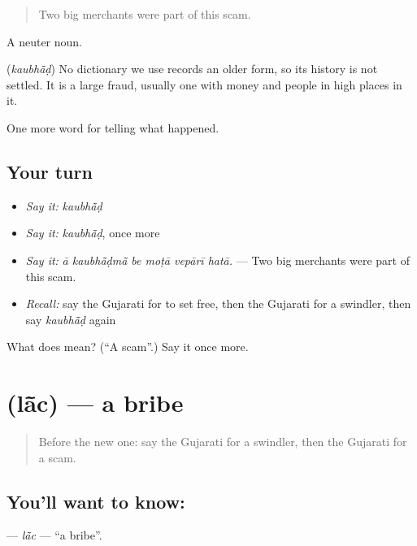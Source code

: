 \begin{quote}
Two big merchants were part of this scam.
\end{quote}

A neuter noun.

\begin{cousinweb}
\textbf{} (\emph{kaubhā̃ḍ}) No dictionary we use records an older form, so its history is not settled. It is a large fraud, usually one with money and people in high places in it.
\end{cousinweb}

\begin{grammarlens}[title={What you've built}]
One more word for telling what happened.
\end{grammarlens}

\subsection*{Your turn}
\begin{itemize}
\raggedright
  \item \emph{Say it:} \emph{kaubhā̃ḍ}
  \item \emph{Say it:} \emph{kaubhā̃ḍ}, once more
  \item \emph{Say it:} \emph{ā kaubhā̃ḍmā̃ be moṭā vepārī hatā.} — Two big merchants were part of this scam.
  \item \emph{Recall:} say the Gujarati for to set free, then the Gujarati for a swindler, then say \emph{kaubhā̃ḍ} again
\end{itemize}

\begin{tcolorbox}[breakable,colback=teal!4,colframe=teal!35!black,title={Before you move on}]
What does  mean? (\textquotedblleft{}A scam\textquotedblright{}.) Say it once more.
\end{tcolorbox}
\section[\texorpdfstring{\gu{લાંચ} (lā̃c)}{લાંચ (lā̃c)}]{ (lā̃c) — a bribe}

\label{lesson:GU-C292-lac}



\begin{quote}
Before the new one: say the Gujarati for a swindler, then the Gujarati for a scam.
\end{quote}

\subsection*{You'll want to know: }
\textbf{} — \emph{lā̃c} — \textquotedblleft{}a bribe\textquotedblright{}.

